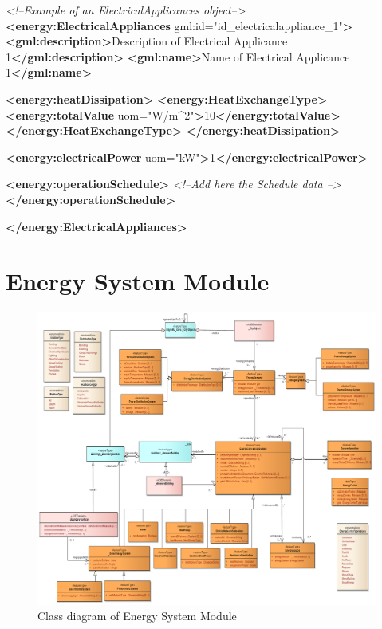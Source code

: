 \documentclass[a4paper,12pt]{article}
\newenvironment{Shaded}{}{}
\newcommand{\KeywordTok}[1]{\textcolor[rgb]{0.00,0.44,0.13}{\textbf{{#1}}}}
\newcommand{\StringTok}[1]{\textcolor[rgb]{0.25,0.44,0.63}{{#1}}}
\newcommand{\CommentTok}[1]{\textcolor[rgb]{0.38,0.63,0.69}{\textit{{#1}}}}
\newcommand{\OtherTok}[1]{\textcolor[rgb]{0.00,0.44,0.13}{{#1}}}
\newcommand{\NormalTok}[1]{{#1}}
\let\stdsection\section%
\renewcommand\section{\newpage\stdsection}
\begin{document}
\begin{Shaded}
\begin{Highlighting}[]
\CommentTok{<!--Example of an ElectricalApplicances object-->}
\KeywordTok{<energy:ElectricalAppliances}\OtherTok{ gml:id=}\StringTok{"id_electricalappliance_1"}\KeywordTok{>}
    \KeywordTok{<gml:description>}\NormalTok{Description of Electrical Applicance 1}\KeywordTok{</gml:description>}
    \KeywordTok{<gml:name>}\NormalTok{Name of Electrical Applicance 1}\KeywordTok{</gml:name>}

    \KeywordTok{<energy:heatDissipation>}
        \KeywordTok{<energy:HeatExchangeType>}
            \KeywordTok{<energy:totalValue}\OtherTok{ uom=}\StringTok{"W/m^2"}\KeywordTok{>}\NormalTok{10}\KeywordTok{</energy:totalValue>}
        \KeywordTok{</energy:HeatExchangeType>}
    \KeywordTok{</energy:heatDissipation>}

    \KeywordTok{<energy:electricalPower}\OtherTok{ uom=}\StringTok{"kW"}\KeywordTok{>}\NormalTok{1}\KeywordTok{</energy:electricalPower>}

    \KeywordTok{<energy:operationSchedule>}
        \CommentTok{<!--Add here the Schedule data -->}
    \KeywordTok{</energy:operationSchedule>}

\KeywordTok{</energy:ElectricalAppliances>}
\end{Highlighting}
\end{Shaded}

\section{Energy System Module}\label{energy-system-module}

\begin{figure}[htbp]
\centering
\includegraphics{fig/class_EnergySystem.png}
\caption{Class diagram of Energy System Module}
\end{figure}
\end{document}
